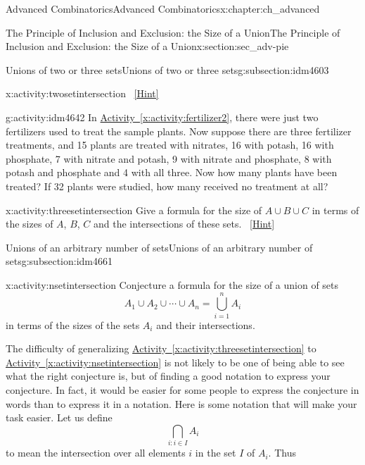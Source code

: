 \documentclass[oneside,10pt,]{book}
\numberwithin{equation}{chapter}
\begin{document}
\begin{chapterptx}{Advanced Combinatorics}{}{Advanced Combinatorics}{}{}{x:chapter:ch_advanced}
\begin{sectionptx}{The Principle of Inclusion and Exclusion: the Size of a Union}{}{The Principle of Inclusion and Exclusion: the Size of a Union}{}{}{x:section:sec_adv-pie}
\begin{subsectionptx}{Unions of two or three sets}{}{Unions of two or three sets}{}{}{g:subsection:idm4603}
\begin{activity}{}{x:activity:twosetintersection}
\qquad~\hfill{\tiny\hyperlink{g:hint:idm4635-back}{[Hint]}}\end{activity}
\begin{activity}{}{g:activity:idm4642}%
In \hyperref[x:activity:fertilizer2]{Activity~\ref{x:activity:fertilizer2}}, there were just two fertilizers used to treat the sample plants. Now suppose there are three fertilizer treatments, and 15 plants are treated with nitrates, 16 with potash, 16 with phosphate, 7 with nitrate and potash, 9 with nitrate and phosphate, 8 with potash and phosphate and 4 with all three. Now how many plants have been treated? If 32 plants were studied, how many received no treatment at all?%
\end{activity}
\begin{activity}{}{x:activity:threesetintersection}%
Give a formula for the size of \(A\cup B\cup C\) in terms of the sizes of \(A\), \(B\), \(C\) and the intersections of these sets.%
\qquad~\hfill{\tiny\hyperlink{g:hint:idm4656-back}{[Hint]}}\end{activity}
\end{subsectionptx}
%
%
\typeout{************************************************}
\typeout{************************************************}
%
\begin{subsectionptx}{Unions of an arbitrary number of sets}{}{Unions of an arbitrary number of sets}{}{}{g:subsection:idm4661}
\begin{activity}{}{x:activity:nsetintersection}%
Conjecture a formula for the size of a union of sets%
\begin{equation*}
A_1\cup
A_2\cup \cdots\cup A_n = \bigcup_{i=1}^n A_i
\end{equation*}
in terms of the sizes of the sets \(A_i\) and their intersections.%
\end{activity}
The difficulty of generalizing \hyperref[x:activity:threesetintersection]{Activity~\ref{x:activity:threesetintersection}} to \hyperref[x:activity:nsetintersection]{Activity~\ref{x:activity:nsetintersection}} is not likely to be one of being able to see what the right conjecture is, but of finding a good notation to express your conjecture. In fact, it would be easier for some people to express the conjecture in words than to express it in a notation. Here is some notation that will make your task easier. Let us define%
\begin{equation*}
\bigcap_{i:i\in I}A_i
\end{equation*}
to mean the intersection over all elements \(i\) in the set \(I\) of \(A_i\). Thus%

\end{subsectionptx}
\end{sectionptx}
\end{chapterptx}
\end{document}
